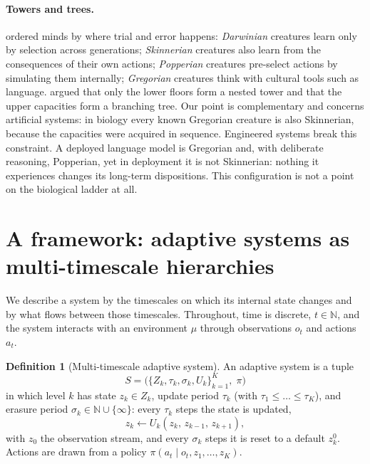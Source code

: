\documentclass[11pt]{article}
\theoremstyle{plain}
\theoremstyle{definition}
\newtheorem{definition}{Definition}
\theoremstyle{remark}
\begin{document}
\paragraph{Towers and trees.}
\citet{dennett1995darwin,dennett1996kinds} ordered minds by where trial and error happens: \emph{Darwinian} creatures learn only by selection across generations; \emph{Skinnerian} creatures also learn from the consequences of their own actions; \emph{Popperian} creatures pre-select actions by simulating them internally; \emph{Gregorian} creatures think with cultural tools such as language. \citet{godfreysmith2018towers} argued that only the lower floors form a nested tower and that the upper capacities form a branching tree. Our point is complementary and concerns artificial systems: in biology every known Gregorian creature is also Skinnerian, because the capacities were acquired in sequence. Engineered systems break this constraint. A deployed language model is Gregorian and, with deliberate reasoning, Popperian, yet in deployment it is not Skinnerian: nothing it experiences changes its long-term dispositions. This configuration is not a point on the biological ladder at all.

\section{A framework: adaptive systems as multi-timescale hierarchies}
\label{sec:framework}

We describe a system by the timescales on which its internal state changes and by what flows between those timescales. Throughout, time is discrete, $t\in\mathbb{N}$, and the system interacts with an environment $\mu$ through observations $o_t$ and actions $a_t$.

\begin{definition}[Multi-timescale adaptive system]
\label{def:mtas}
An adaptive system is a tuple
\[
S=\big(\{Z_k,\tau_k,\sigma_k,U_k\}_{k=1}^{K},\;\pi\big)
\]
in which level $k$ has state $z_k\in Z_k$, update period $\tau_k$ (with $\tau_1\le\dots\le\tau_K$), and erasure period $\sigma_k\in\mathbb{N}\cup\{\infty\}$: every $\tau_k$ steps the state is updated,
\[
z_k\leftarrow U_k(z_k,\,z_{k-1},\,z_{k+1}),
\]
with $z_0$ the observation stream, and every $\sigma_k$ steps it is reset to a default $z_k^{0}$. Actions are drawn from a policy $\pi(a_t\mid o_t,z_1,\dots,z_K)$.
\end{definition}
\end{document}
